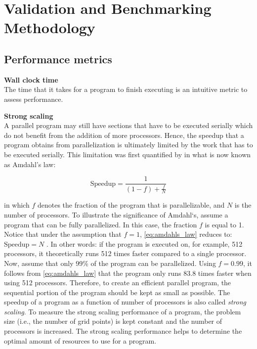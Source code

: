 \chapter{Validation and Benchmarking Methodology}

\section{Performance metrics}

\noindent \textbf{Wall clock time} \\
The time that it takes for a program to finish executing is an intuitive metric to assess performance. 

\medskip

\noindent \textbf{Strong scaling} \\
A parallel program may still have sections that have to be executed serially which do not benefit from the addition of more processors. Hence, the speedup that a program obtains from parallelization is ultimately limited by the work that has to be executed serially. This limitation was first quantified by \citet{amdahlValiditySingleProcessor1967} in what is now known as Amdahl's law: 

\begin{equation}
    \text{Speedup} = \frac{1}{(1-f) + \displaystyle \frac{f}{N}}
    \label{eq:amdahls_law}
\end{equation}

\noindent in which $f$ denotes the fraction of the program that is parallelizable, and $N$ is the number of processors. To illustrate the significance of Amdahl`s, assume a program that can be fully parallelized. In this case, the fraction $f$ is equal to 1. Notice that under the assumption that $f=1$, \autoref{eq:amdahls_law} reduces to: $\text{Speedup} = N$ . In other words: if the program is executed on, for example, 512 processors, it theoretically runs 512 times faster compared to a single processor. Now, assume that only 99\% of the program can be parallelized. Using $f=0.99$, it follows from \autoref{eq:amdahls_law} that the program only runs 83.8 times faster when using 512 processors. Therefore, to create an efficient parallel program, the sequential portion of the program should be kept as small as possible. The speedup of a program as a function of number of processors is also called \emph{strong scaling}. To measure the strong scaling performance of a program, the problem size (i.e., the number of grid points) is kept constant and the number of processors is increased. The strong scaling performance helps to determine the optimal amount of resources to use for a program.

